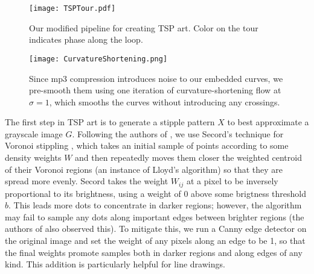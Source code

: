 \documentclass[runningheads]{llncs}
\begin{document}
\begin{figure}
  \centering
  \texttt{[image: TSPTour.pdf]}
  \caption{Our modified pipeline for creating TSP art.  Color on the tour indicates phase along the loop.}
  \label{fig:TSPTour}
\end{figure}

\begin{figure}
  \begin{minipage}[c]{0.4\textwidth}
    \caption{
      Since mp3 compression introduces noise to our embedded curves, we pre-smooth them using one iteration of curvature-shortening flow at $\sigma=1$, which smooths the curves without introducing any crossings.
    } \label{fig:CurvatureShortening}
  \end{minipage}
  \begin{minipage}[c]{0.6\textwidth}
    \texttt{[image: CurvatureShortening.png]}
  \end{minipage}\hfill
\end{figure}

The first step in TSP art is to generate a stipple pattern $X$ to best approximate a grayscale image $G$.  Following the authors of \cite{kaplan2005tsp}, we use Secord's technique for Voronoi stippling \cite{secord2002weighted}, which takes an initial sample of points according to some density weights $W$ and then repeatedly moves them closer the weighted centroid of their Voronoi regions (an instance of Lloyd's algorithm) so that they are spread more evenly.  Secord \cite{secord2002weighted} takes the weight $W_{ij}$ at a pixel to be inversely proportional to its brightness, using a weight of $0$ above some brigtness threshold $b$.  This leads more dots to concentrate in darker regions; however, the algorithm may fail to sample any dots along important edges between brighter regions (the authors of \cite{li2011structure} also observed this).  To mitigate this, we run a Canny edge detector \cite{canny1986computational} on the original image and set the weight of any pixels along an edge to be 1, so that the final weights promote samples both in darker regions and along edges of any kind.  This addition is particularly helpful for line drawings.  %
\end{document}
